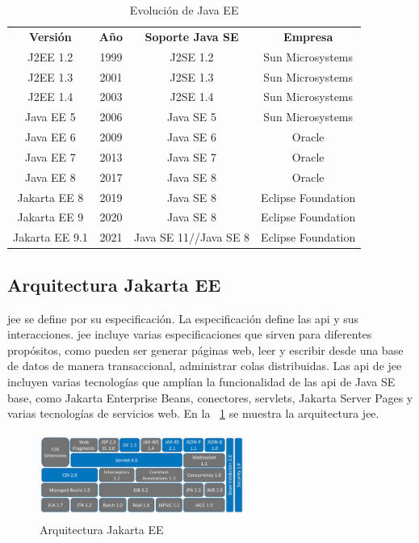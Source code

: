 \begin{table}[hp!]
  \centering
  \begin{tabular}{c|c|c|c}
  \rowcolor{udcpink!25}
  \textbf{Versión} & \textbf{Año} & \textbf{Soporte Java SE} & \textbf{Empresa}\\
J2EE 1.2 & 1999 & J2SE 1.2 & Sun Microsystems \\
J2EE 1.3 & 2001 & J2SE 1.3 & Sun Microsystems \\
J2EE 1.4 &2003 & J2SE 1.4 & Sun Microsystems \\
Java EE 5 & 2006 & Java SE 5 & Sun Microsystems \\
Java EE 6 & 2009 & Java SE 6 & Oracle \\
Java EE 7 & 2013 & Java SE 7 & Oracle \\
Java EE 8 & 2017 & Java SE 8 & Oracle \\
Jakarta EE 8 & 2019 & Java SE 8 & Eclipse Foundation \\
Jakarta EE 9 & 2020 & Java SE 8 & Eclipse Foundation \\
Jakarta EE 9.1 & 2021 & Java SE 11//Java SE 8 & Eclipse Foundation \\
  \end{tabular}
  \caption{Evolución de Java EE}
  \label{tab:evolucionJavaEE}
\end{table}



\subsection{Arquitectura Jakarta EE}
\label{sec:arquitectura}


\acrshort{jee} se define por su especificación. La especificación define las \acrfull{api} y sus interacciones. \acrshort{jee} incluye varias especificaciones que sirven para diferentes propósitos, como pueden ser generar páginas web, leer y escribir desde una base de datos de manera transaccional, administrar colas distribuidas. Las \acrshort{api} de \acrshort{jee} incluyen varias tecnologías que amplían la funcionalidad de las \acrshort{api} de Java SE base, como Jakarta Enterprise Beans, conectores, servlets, Jakarta Server Pages y varias tecnologías de servicios web. En la \figurename~\ref{fig:arquitecturaJakartaEE} se muestra la arquitectura \acrshort{jee}.


\begin{figure}[hp!]
  \centering
  \includegraphics[width=0.6\textwidth]{imaxes/JakartaEE-Architecture.png}
  \caption{Arquitectura Jakarta EE}
  \label{fig:arquitecturaJakartaEE}
\end{figure}

